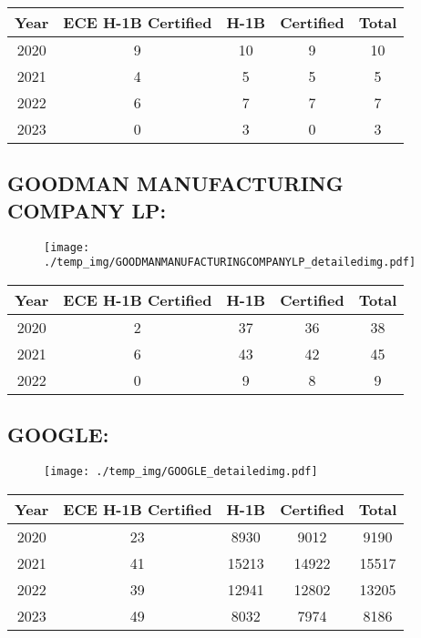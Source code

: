 \documentclass{article}%
\begin{document}
%
\begin{longtable}{c|c|c|c|c}%
\hline%
Year&ECE H{-}1B Certified&H{-}1B&Certified&Total\\%
\hline%
2020&9&10&9&10\\%
\hline%
2021&4&5&5&5\\%
\hline%
2022&6&7&7&7\\%
\hline%
2023&0&3&0&3\\%
\hline%
\end{longtable}

%
\newpage%
\subsection{GOODMAN MANUFACTURING COMPANY LP:}%
\label{subsec:GOODMANMANUFACTURINGCOMPANYLP}%
\label{GOODMANMANUFACTURINGCOMPANYLPdetailed}%


\begin{figure}[htbp]%
\centering%
\texttt{[image: ./temp\_img/GOODMANMANUFACTURINGCOMPANYLP\_detailedimg.pdf]}%
\end{figure}

%
\begin{longtable}{c|c|c|c|c}%
\hline%
Year&ECE H{-}1B Certified&H{-}1B&Certified&Total\\%
\hline%
2020&2&37&36&38\\%
\hline%
2021&6&43&42&45\\%
\hline%
2022&0&9&8&9\\%
\hline%
\end{longtable}

%
\newpage%
\subsection{GOOGLE:}%
\label{subsec:GOOGLE}%
\label{GOOGLEdetailed}%


\begin{figure}[htbp]%
\centering%
\texttt{[image: ./temp\_img/GOOGLE\_detailedimg.pdf]}%
\end{figure}

%
\begin{longtable}{c|c|c|c|c}%
\hline%
Year&ECE H{-}1B Certified&H{-}1B&Certified&Total\\%
\hline%
2020&23&8930&9012&9190\\%
\hline%
2021&41&15213&14922&15517\\%
\hline%
2022&39&12941&12802&13205\\%
\hline%
2023&49&8032&7974&8186\\%
\hline%
\end{longtable}
\end{document}
